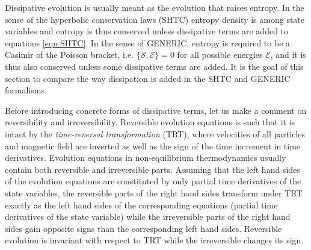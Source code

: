 \documentclass[twoside]{article}
\newcommand{\SF}{\mathscr{S}}
\newcommand{\EF}{\mathscr{E}}
\begin{document}

Dissipative evolution is usually meant as the evolution that 
raises entropy. In the sense of the hyperbolic conservation laws (SHTC) entropy 
density is among state variables and entropy is thus conserved unless 
dissipative terms are added to equations \eqref{eqn.SHTC}. In the sense of 
GENERIC, 
entropy is required to be a Casimir of the Poisson bracket, i.e. $\{\SF,\EF\}=0$ 
for all possible energies $\EF$, and it is thus also conserved unless some 
dissipative terms are added. It is the goal of this section to compare the way 
dissipation is added in the SHTC and GENERIC formalisms. 

Before introducing concrete forms of dissipative terms, let us make a comment 
on reversibility and irreversibility. Reversible evolution equations is such 
that it is intact by the \textit{time-reversal transformation} (TRT), where 
velocities 
of all particles and magnetic field are inverted as well as the sign of the 
time increment in time derivatives. Evolution 
equations in non-equilibrium thermodynamics usually contain both reversible and 
irreversible parts. Assuming that the left hand sides of the evolution 
equations are constituted by only partial time derivatives of the state 
variables, the reversible parts of the right hand sides transform under TRT 
exactly as the left hand 
sides of the corresponding equations (partial time derivatives of the state 
variable) while the 
irreversible parts of the right hand sides gain opposite signs than the 
corresponding left 
hand sides. Reversible evolution is invariant with respect to TRT while the 
irreversible changes its sign.
\end{document}

